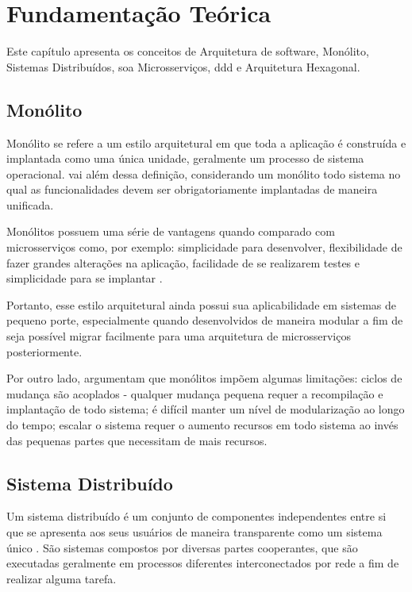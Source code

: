 \chapter{Fundamentação Teórica}
\label{cap:fundamentacao}

Este capítulo apresenta os conceitos de Arquitetura de software, Monólito, Sistemas Distribuídos, \acrfull{soa} Microsserviços, \acrfull{ddd} e Arquitetura Hexagonal.

\section{Monólito} 
Monólito se refere a um estilo arquitetural em que toda a aplicação é construída e implantada como uma única unidade, geralmente um processo de sistema operacional.  vai além dessa definição, considerando um monólito todo sistema no qual as funcionalidades devem ser obrigatoriamente implantadas de maneira unificada.

Monólitos possuem uma série de vantagens quando comparado com microsserviços  como, por exemplo: simplicidade para desenvolver, flexibilidade de fazer grandes alterações na aplicação, facilidade de se realizarem testes e simplicidade para se implantar \cite{richardson2018microservices}.

Portanto, esse estilo arquitetural ainda possui sua aplicabilidade em sistemas de pequeno porte, especialmente quando desenvolvidos de maneira modular a fim de seja possível migrar facilmente para uma arquitetura de microsserviços posteriormente.

Por outro lado,  argumentam que monólitos impõem algumas limitações: ciclos de mudança são acoplados - qualquer mudança pequena requer a recompilação e implantação de todo sistema; é difícil manter um nível de modularização ao longo do tempo; escalar o sistema requer o aumento recursos em todo sistema ao invés das pequenas partes que necessitam de mais recursos.

\section{Sistema Distribuído} 
\label{section:sistemas_distribuidos}

Um sistema distribuído é um conjunto de componentes independentes entre si que se apresenta aos seus usuários de maneira transparente como um sistema único \cite{tanenbaum2010sistemas}. São sistemas compostos por diversas partes cooperantes, que são executadas geralmente em processos diferentes interconectados por rede a fim de realizar alguma tarefa. 

